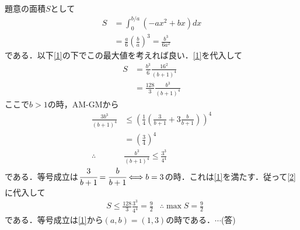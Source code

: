 \documentclass[a4j]{jarticle}
\begin{document}
\begin{multicols}{2}
\begin{center}
     \end{center}
     
　\\
     
     題意の面積$S$として
     \begin{align*}
     S&=\int_0^{b/a}(-ax^2+bx)dx \\
     &=\frac{a}{6}\left(\frac{b}{a}\right)^3=\frac{b^3}{6a^2}
     \end{align*}
である．以下\eqref{1}の下でこの最大値を考えれば良い．\eqref{1}を代入して
     \begin{align}
     S&=\frac{b^3}{6}\frac{16^2}{(b+1)^4} \nonumber\\
     &=\frac{128}{3}\frac{b^3}{(b+1)^4}\label{2}　
     \end{align}
ここで$b>1$の時，AM-GMから
     \begin{align*}
     \frac{3b^3}{(b+1)^4}&\le\left(\frac{1}{4}\left(\frac{3}{b+1}+3\frac{b}{b+1}\right)\right)^4 \\
     &=\left(\frac{3}{4}\right)^4 \\
     \therefore &\frac{b^3}{(b+1)^4}\le \frac{3^3}{4^4}
     \end{align*}
である．等号成立は$\cfrac{3}{b+1}=\cfrac{b}{b+1}\Longleftrightarrow b=3$の時．これは\eqref{1}を満たす．従って\eqref{2}
に代入して
     \begin{align*}
     &S\le\frac{128}{3}\frac{3^3}{4^4}=\frac{9}{2}
     &\therefore \max S=\frac{9}{2}
     \end{align*}
である．等号成立は\eqref{1}から$(a,b)=(1,3)$の時である．$\cdots$(答)
     
     
\newpage
\end{multicols}
\end{document}
